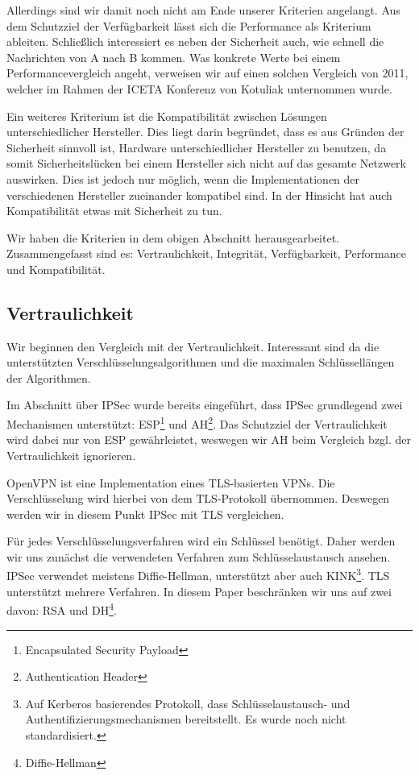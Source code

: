 \documentclass[12pt]{scrartcl}
\begin{document}
Allerdings sind wir damit noch nicht am Ende unserer Kriterien angelangt. Aus dem Schutzziel der Verfügbarkeit lässt sich die Performance als Kriterium ableiten. Schließlich interessiert es neben der Sicherheit auch, wie schnell die Nachrichten von A nach B kommen. Was konkrete Werte bei einem Performancevergleich angeht, verweisen wir auf einen solchen Vergleich von 2011, welcher im Rahmen der ICETA Konferenz von Kotuliak\cite{Kotuliak2011} unternommen wurde.

Ein weiteres Kriterium ist die Kompatibilität zwischen Lösungen unterschiedlicher Hersteller. Dies liegt darin begründet, dass es aus Gründen der Sicherheit sinnvoll ist, Hardware unterschiedlicher Hersteller zu benutzen, da somit Sicherheitslücken bei einem Hersteller sich nicht auf das gesamte Netzwerk auswirken. Dies ist jedoch nur möglich, wenn die Implementationen der verschiedenen Hersteller zueinander kompatibel sind. In der Hinsicht hat auch Kompatibilität etwas mit Sicherheit zu tun.

Wir haben die Kriterien in dem obigen Abschnitt herausgearbeitet. Zusammengefasst sind es: Vertraulichkeit, Integrität, Verfügbarkeit, Performance und Kompatibilität.

\subsection{Vertraulichkeit}
Wir beginnen den Vergleich mit der Vertraulichkeit. Interessant sind da die unterstützten Verschlüsselungsalgorithmen und die maximalen Schlüssellängen der Algorithmen.

Im Abschnitt über IPSec wurde bereits eingeführt, dass IPSec grundlegend zwei Mechanismen unterstützt: ESP\footnote{Encapsulated Security Payload} und AH\footnote{Authentication Header}. Das Schutzziel der Vertraulichkeit wird dabei nur von ESP gewährleistet, weswegen wir AH beim Vergleich bzgl. der Vertraulichkeit ignorieren.

OpenVPN ist eine Implementation eines TLS-basierten VPNs. Die Verschlüsselung wird hierbei von dem TLS-Protokoll übernommen. Deswegen werden wir in diesem Punkt IPSec mit TLS vergleichen.

Für jedes Verschlüsselungsverfahren wird ein Schlüssel benötigt. Daher werden wir uns zunächst die verwendeten Verfahren zum Schlüsselaustausch ansehen. IPSec verwendet meistens Diffie-Hellman, unterstützt aber auch KINK\footnote{Auf Kerberos basierendes Protokoll, dass Schlüsselaustausch- und Authentifizierungsmechanismen bereitstellt. Es wurde noch nicht standardisiert\cite{Alshamsi2005}.}. TLS unterstützt mehrere Verfahren. In diesem Paper beschränken wir uns auf zwei davon: RSA und DH\footnote{Diffie-Hellman}\cite{Alshamsi2005}. %
\end{document}
